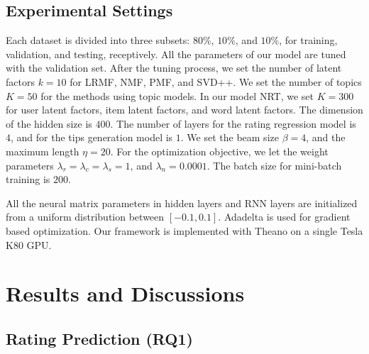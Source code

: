 \documentclass[sigconf]{acmart}
\begin{document}
\subsection{Experimental Settings}
Each dataset is divided into three subsets: $80\%$, $10\%$, and $10\%$, for training, validation, and testing, receptively. All the parameters of our model  are tuned with the validation set.
After the tuning process, we set the number of latent factors $k = 10$ for LRMF, NMF, PMF, and SVD++.
We set the number of topics $K = 50$ for the methods using topic models.
In our model NRT, we set $K = 300$ for user latent factors, item latent factors, and word latent factors. The dimension of the hidden size is $400$.
The number of layers for the rating regression model is $4$, and for the tips generation model is $1$.
We set the beam size $\beta = 4$, and the maximum length $\eta = 20$.
For the optimization objective, we let the weight parameters $\lambda_r = \lambda_c = \lambda_s = 1$, and $\lambda_n = 0.0001$.
The batch size for mini-batch training is $200$.

All the neural matrix parameters in hidden layers and RNN layers are initialized from a uniform distribution between $[-0.1, 0.1]$.
Adadelta \cite{zeiler2012adadelta} is used for gradient based optimization.
Our framework is implemented with Theano \cite{2016arXiv160502688short} on a single Tesla K80 GPU.

\section{Results and Discussions}
\label{section5}

\subsection{Rating Prediction (RQ1)}
\label{sec:exp:rating}
\end{document}
